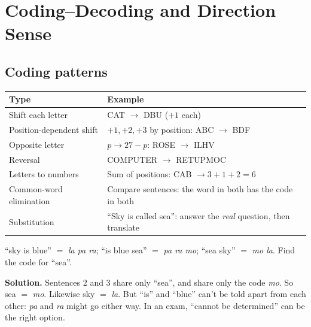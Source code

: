 \documentclass[11pt,a4paper,openany]{report}
\begin{document}
\chapter{Coding--Decoding and Direction Sense}\label{ch:code}

\section{Coding patterns}
\begin{center}\small
\begin{tabular}{>{\raggedright}p{4cm}>{\raggedright\arraybackslash}p{10.4cm}}
\toprule
Type & Example\\\midrule
Shift each letter & CAT $\to$ DBU ($+1$ each)\\
Position-dependent shift & $+1,+2,+3$ by position: ABC $\to$ BDF\\
Opposite letter & $p\to27-p$: ROSE $\to$ ILHV\\
Reversal & COMPUTER $\to$ RETUPMOC\\
Letters to numbers & Sum of positions: CAB $\to3+1+2=6$\\
Common-word elimination & Compare sentences: the word in both has the code in both\\
Substitution & ``Sky is called sea'': answer the \emph{real} question, then translate\\
\bottomrule
\end{tabular}
\end{center}

\begin{example}
``sky is blue'' $=$ \emph{la pa ra}; ``is blue sea'' $=$ \emph{pa ra mo}; ``sea sky'' $=$ \emph{mo la}. Find the code for ``sea''.

\textbf{Solution.} Sentences 2 and 3 share only ``sea'', and share only the code \emph{mo}. So sea $=$ \emph{mo}. Likewise sky $=$ \emph{la}. But ``is'' and ``blue'' can't be told apart from each other: \emph{pa} and \emph{ra} might go either way. In an exam, ``cannot be determined'' can be the right option.
\end{example}
\end{document}
